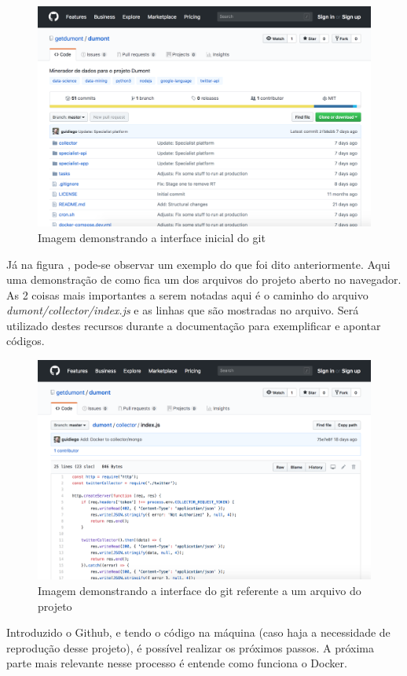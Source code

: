 \begin{figure}
    \centering
    \includegraphics[width=.8\textwidth]{imagens/git_init.png}
    \caption{Imagem demonstrando a interface inicial do git}
    \label{fig:git_init}
\end{figure}

Já na figura \label{fig:git_file}, pode-se observar um exemplo do que foi dito anteriormente. Aqui uma demonstração de como fica um dos arquivos do projeto aberto no navegador. As 2 coisas mais importantes a serem notadas aqui é o caminho do arquivo \textit{dumont/collector/index.js} e as linhas que são mostradas no arquivo. Será utilizado destes recursos durante a documentação para exemplificar e apontar códigos.

\begin{figure}
    \centering
    \includegraphics[width=.8\textwidth]{imagens/git_file.png}
    \caption{Imagem demonstrando a interface do git referente a um arquivo do projeto}
    \label{fig:git_file}
\end{figure}

Introduzido o Github, e tendo o código na máquina (caso haja a necessidade de reprodução desse projeto), é possível realizar os próximos passos. A próxima parte mais relevante nesse processo é entende como funciona o Docker.
